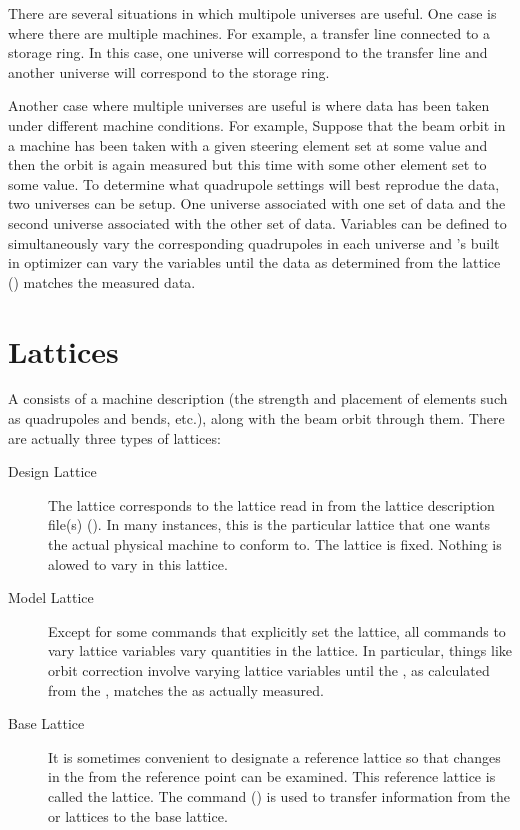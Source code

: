 There are several situations in which multipole universes are
useful. One case is where there are multiple machines. For example, a
transfer line connected to a storage ring. In this case, one universe
will correspond to the transfer line and another universe will
correspond to the storage ring. 

Another case where multiple universes are useful is where data has
been taken under different machine conditions. For example, Suppose
that the beam orbit in a machine has been taken with a given steering
element set at some value and then the orbit is again measured but
this time with some other element set to some value. To determine what
quadrupole settings will best reprodue the data, two universes can be
setup. One universe associated with one set of data and the second
universe associated with the other set of data. Variables can be
defined to simultaneously vary the corresponding quadrupoles in each
universe and \tao's built in optimizer can vary the variables until
the data as determined from the  lattice ()
matches the measured data.

\section{Lattices}
\label{s:lattice}

A  consists of a machine description (the strength and
placement of elements such as quadrupoles and bends, etc.), along with the
beam orbit through them. There are actually three types of lattices:
  \vspace*{-3ex}
  \begin{description}
  \item[Design Lattice] \Newline 
The  lattice corresponds to the lattice read in from the
lattice description file(s) (). In many instances, this
is the particular lattice that one wants the actual physical machine
to conform to. The  lattice is fixed. Nothing is alowed to
vary in this lattice.
  \item[Model Lattice] \Newline
Except for some commands that explicitly set the  lattice,
all \tao commands to vary lattice variables vary quantities in the
 lattice. In particular, things like orbit correction
involve varying  lattice variables until the ,
as calculated from the , matches the  as actually measured.
  \item[Base Lattice] \Newline
It is sometimes convenient to designate a reference lattice so that
changes in the  from the reference point can be examined.
This reference lattice is called the  lattice. The 
command () is used to transfer information from the
 or  lattices to the base lattice.
  \end{description}

